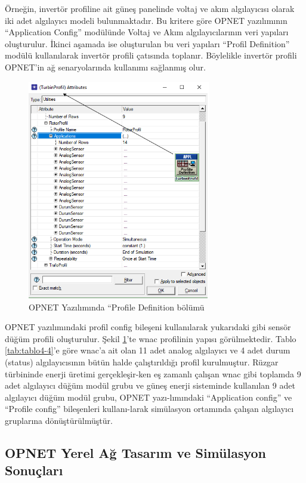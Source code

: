 Örneğin, invertör profiline ait güneş panelinde voltaj ve akım algılayıcısı olarak iki adet algılayıcı modeli bulunmaktadır. Bu kritere göre OPNET yazılımının “Application Config” modülünde Voltaj ve Akım algılayıcılarının veri yapıları oluşturulur. İkinci aşamada ise oluşturulan bu veri yapıları “Profil Definition” modülü kullanılarak invertör profili çatısında toplanır. Böylelikle invertör profili OPNET’in ağ senaryolarında kullanımı sağlanmış olur.

\begin{figure}[htbp]
\centerline{\includegraphics[width=8cm]{Resim/sekil4-5.png}}
\caption{OPNET Yazılımında “Profile Definition bölümü}
\label{fig:4-5}
\end{figure}


OPNET yazılımındaki profil config bileşeni kullanılarak yukarıdaki gibi sensör düğüm profili oluşturulur. Şekil \ref{fig:4-5}’te \gls{wnac} profilinin yapısı görülmektedir. Tablo \ref{tab:tablo4-4}’e göre \gls{wnac}'a ait olan 11 adet analog algılayıcı ve 4 adet durum (status) algılayıcısının bütün halde çalıştırıldığı profil kurulmuştur. Rüzgar türbininde enerji üretimi gerçekleşir-ken eş zamanlı çalışan \gls{wnac} gibi toplamda 9 adet algılayıcı düğüm modül grubu ve güneş enerji sisteminde kullanılan 9 adet algılayıcı düğüm modül grubu, OPNET yazı-lımındaki “Application config” ve “Profile config” bileşenleri kullanı-larak simülasyon ortamında çalışan algılayıcı gruplarına dönüştürülmüştür.



\subsection{OPNET Yerel Ağ Tasarım ve Simülasyon Sonuçları}

